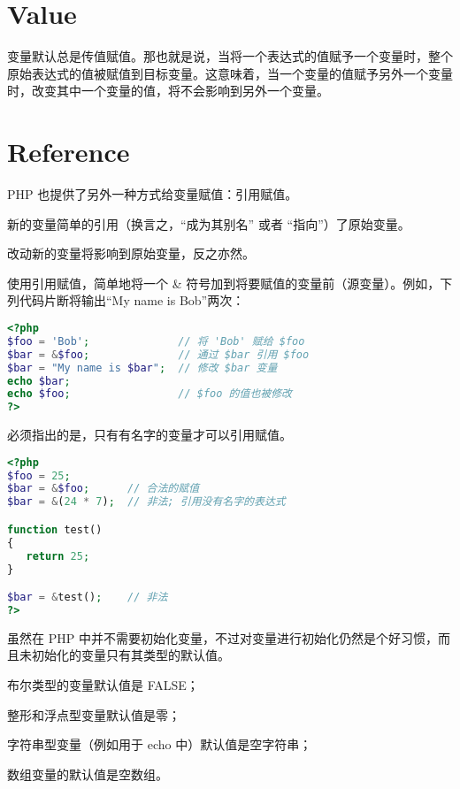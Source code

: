 \section{Value}


变量默认总是传值赋值。那也就是说，当将一个表达式的值赋予一个变量时，整个原始表达式的值被赋值到目标变量。这意味着，当一个变量的值赋予另外一个变量时，改变其中一个变量的值，将不会影响到另外一个变量。

\section{Reference}


PHP 也提供了另外一种方式给变量赋值：引用赋值。

\begin{compactitem}
\item 新的变量简单的引用（换言之，“成为其别名” 或者 “指向”）了原始变量。
\item 改动新的变量将影响到原始变量，反之亦然。
\end{compactitem}


使用引用赋值，简单地将一个 \& 符号加到将要赋值的变量前（源变量）。例如，下列代码片断将输出“My name is Bob”两次：

\begin{lstlisting}[language=PHP]
<?php
$foo = 'Bob';              // 将 'Bob' 赋给 $foo
$bar = &$foo;              // 通过 $bar 引用 $foo
$bar = "My name is $bar";  // 修改 $bar 变量
echo $bar;
echo $foo;                 // $foo 的值也被修改
?>
\end{lstlisting}

必须指出的是，只有有名字的变量才可以引用赋值。

\begin{lstlisting}[language=PHP]
<?php
$foo = 25;
$bar = &$foo;      // 合法的赋值
$bar = &(24 * 7);  // 非法; 引用没有名字的表达式

function test()
{
   return 25;
}

$bar = &test();    // 非法
?>
\end{lstlisting}

虽然在 PHP 中并不需要初始化变量，不过对变量进行初始化仍然是个好习惯，而且未初始化的变量只有其类型的默认值。

\begin{compactitem}
\item 布尔类型的变量默认值是 FALSE；
\item 整形和浮点型变量默认值是零；
\item 字符串型变量（例如用于 echo 中）默认值是空字符串；
\item 数组变量的默认值是空数组。
\end{compactitem}

